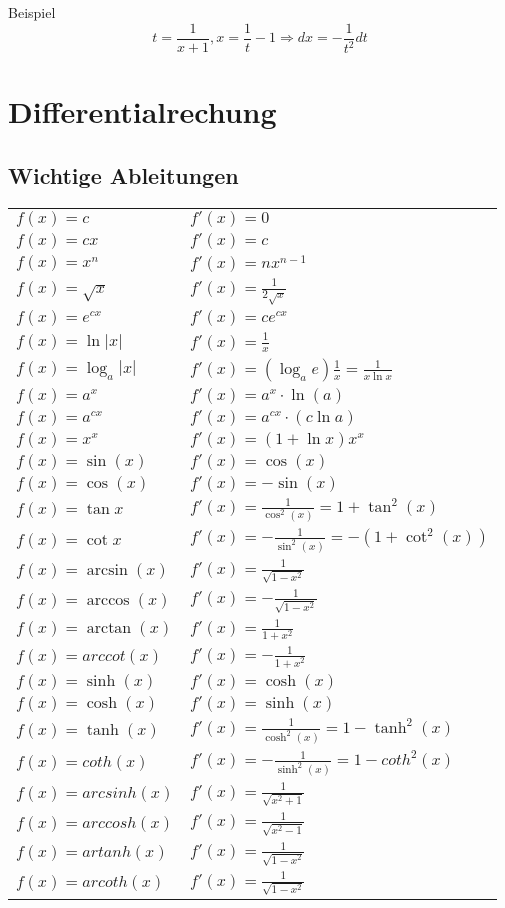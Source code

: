 \documentclass[german, 10pt, a4paper, twocolumn]{scrartcl}
\theoremstyle{definition}
\begin{document}
Beispiel
\begin{displaymath}
	t = \frac{1}{x+1}, x=\frac{1}{t} -1 \Rightarrow dx = - \frac{1}{t^2}dt
\end{displaymath}


\section{Differentialrechung}

\subsection{Wichtige Ableitungen}

\footnotesize
\begin{tabular}{ll}
 $f(x)=c$ & 		$f'(x)=0$\\
 $f(x)=cx$ &		$f'(x)=c$\\
 $f(x)=x^n$ &		$f'(x)=nx^{n-1}$\\
 $f(x)=\sqrt{x}$ &	$f'(x)=\frac{1}{2\sqrt{x}}$\\
 $f(x)=e^{cx}$ &	$f'(x)=ce^{cx}$\\
 $f(x)=\ln |x|$ &	$f'(x)=\frac{1}{x}$\\
 $f(x)=\log_a|x|$ &	$f'(x)=(\log_a e)\frac{1}{x}=\frac{1}{x\ln x}$\\
 $f(x)=a^x$ &		$f'(x)=a^x\cdotp \ln(a)$\\
 $f(x)=a^{cx}$ &	$f'(x)=a^{cx}\cdotp (c\ln a)$\\
 $f(x)=x^{x}$ &		$f'(x)=(1+\ln x)x^x$\\
 $f(x)=\sin(x)$ &	$f'(x)=\cos(x)$\\
 $f(x)=\cos(x)$ &	$f'(x)=-\sin(x)$\\
 $f(x)=\tan{x}$ &	$f'(x)=\frac{1}{\cos^2(x)}=1+\tan^2(x)$\\
 $f(x)=\cot{x}$ &	$f'(x)=-\frac{1}{\sin^2(x)}=-(1+\cot^2(x))$\\
 $f(x)=\arcsin(x)$ &	$f'(x)=\frac{1}{\sqrt{1-x^2}}$\\
 $f(x)=\arccos(x)$ &	$f'(x)=-\frac{1}{\sqrt{1-x^2}}$\\
 $f(x)=\arctan(x)$ &	$f'(x)=\frac{1}{1+x^2}$\\
 $f(x)=arccot(x)$ &	$f'(x)=-\frac{1}{1+x^2}$\\
 $f(x)=\sinh(x)$ &	$f'(x)=\cosh(x)$\\
 $f(x)=\cosh(x)$ &	$f'(x)=\sinh(x)$\\
 $f(x)=\tanh(x)$ &	$f'(x)=\frac{1}{\cosh^2(x)}=1-\tanh^2(x)$\\
 $f(x)=coth(x)$ &	$f'(x)=-\frac{1}{\sinh^2(x)}=1-coth^2(x)$\\
 $f(x)=arcsinh(x)$ &	$f'(x)=\frac{1}{\sqrt{x^2+1}}$\\
 $f(x)=arccosh(x)$ &	$f'(x)=\frac{1}{\sqrt{x^2-1}}$\\
 $f(x)=artanh(x)$ &	$f'(x)=\frac{1}{\sqrt{1-x^2}}$\\
 $f(x)=arcoth(x)$ &	$f'(x)=\frac{1}{\sqrt{1-x^2}}$\\
\end{tabular}
\normalsize
\end{document}
